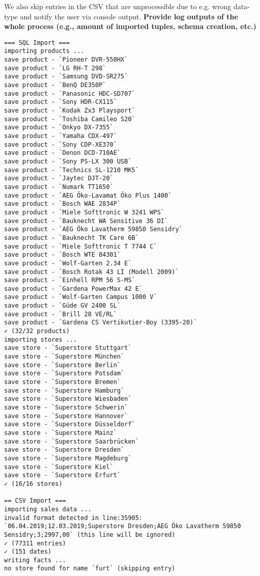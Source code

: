 \documentclass[a4paper,english,abstract=on]{scrartcl}
\begin{document}
We also skip entries in the CSV that are unprocessible due to e.g. wrong data-type and notify the user via console output.
\newpage
\textbf{Provide log outputs of the whole process (e.g., amount of imported tuples, schema creation, etc.)}
\begin{lstlisting}
=== SQL Import ===
importing products ...
save product - `Pioneer DVR-550HX`
save product - `LG RH-T 298`
save product - `Samsung DVD-SR275`
save product - `BenQ DE350P`
save product - `Panasonic HDC-SD707`
save product - `Sony HDR-CX115`
save product - `Kodak Zx3 Playsport`
save product - `Toshiba Camileo S20`
save product - `Onkyo DX-7355`
save product - `Yamaha CDX-497`
save product - `Sony CDP-XE370`
save product - `Denon DCD-710AE`
save product - `Sony PS-LX 300 USB`
save product - `Technics SL-1210 MK5`
save product - `Jaytec DJT-20`
save product - `Numark TT1650`
save product - `AEG Öko-Lavamat Öko Plus 1400`
save product - `Bosch WAE 2834P`
save product - `Miele Softtronic W 3241 WPS`
save product - `Bauknecht WA Sensitive 36 DI`
save product - `AEG Öko Lavatherm 59850 Sensidry`
save product - `Bauknecht TK Care 6B`
save product - `Miele Softtronic T 7744 C`
save product - `Bosch WTE 84301`
save product - `Wolf-Garten 2.34 E`
save product - `Bosch Rotak 43 LI (Modell 2009)`
save product - `Einhell RPM 56 S-MS`
save product - `Gardena PowerMax 42 E`
save product - `Wolf-Garten Campus 1000 V`
save product - `Güde GV 2400 SL`
save product - `Brill 28 VE/RL`
save product - `Gardena CS Vertikutier-Boy (3395-20)`
✓ (32/32 products)
importing stores ...
save store - `Superstore Stuttgart`
save store - `Superstore München`
save store - `Superstore Berlin`
save store - `Superstore Potsdam`
save store - `Superstore Bremen`
save store - `Superstore Hamburg`
save store - `Superstore Wiesbaden`
save store - `Superstore Schwerin`
save store - `Superstore Hannover`
save store - `Superstore Düsseldorf`
save store - `Superstore Mainz`
save store - `Superstore Saarbrücken`
save store - `Superstore Dresden`
save store - `Superstore Magdeburg`
save store - `Superstore Kiel`
save store - `Superstore Erfurt`
✓ (16/16 stores)

== CSV Import ===
importing sales data ... 
invalid format detected in line:35905: `06.04.2019;12.03.2019;Superstore Dresden;AEG Öko Lavatherm 59850 Sensidry;3;2997,00` (this line will be ignored)
✓ (77311 entries)
✓ (151 dates)
writing facts ... 
no store found for name ´furt` (skipping entry)

\end{lstlisting}
\end{document}

